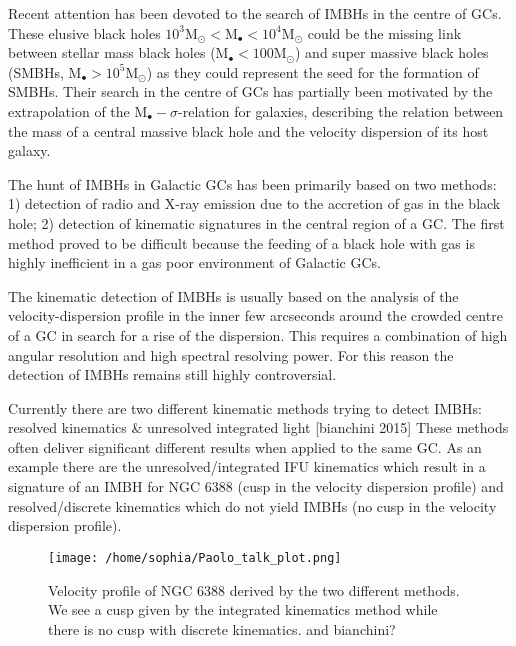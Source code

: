 \par Recent attention has been devoted to the search of \acp{IMBH} in the centre of \acp{GC}. These elusive black holes \(10^3 \mathrm{M}_\odot < \mathrm{M}_\bullet < 10^4 \mathrm{M}_\odot\) could be the missing link between stellar mass black holes (\(\mathrm{M}_\bullet < 100 \mathrm{M}_\odot\)) and super massive black holes (\acsp{SMBH}, \(\mathrm{M}_\bullet > 10^5 \mathrm{M}_\odot\)) as they could represent the seed for the formation of \acp{SMBH}. Their search in the centre of \acp{GC} has partially been motivated by the extrapolation of the \(\mathrm{M}_\bullet-\sigma\)-relation for galaxies, describing the relation between the mass of a central massive black hole and the velocity dispersion of its host galaxy.
\par The hunt of \acp{IMBH} in Galactic \acp{GC} has been primarily based on two methods: 1) detection of radio and X-ray emission due to the accretion of gas in the black hole; 2) detection of kinematic signatures in the central region of a \ac{GC}. The first method proved to be difficult because the feeding of a black hole with gas is highly inefficient in a gas poor environment of Galactic \acp{GC}. 
\par The kinematic detection of \acp{IMBH} is usually based on the analysis of the velocity-dispersion profile in the inner few arcseconds around the crowded centre of a \ac{GC} in search for a rise of the dispersion. This requires a combination of high angular resolution and high spectral resolving power. For this reason the detection of \acp{IMBH} remains still highly controversial. 
\par Currently there are two different kinematic methods trying to detect \acp{IMBH}: \color{red} resolved kinematics \& unresolved integrated light [bianchini 2015] \cite{2015MNRAS.453..365B} \color{black} These methods often deliver significant different results when applied to the same \ac{GC}. As an example there are the unresolved/integrated IFU kinematics which result in a signature of an \ac{IMBH} for NGC 6388 (cusp in the velocity dispersion profile) and resolved/discrete kinematics which do not yield \acp{IMBH} (no cusp in the velocity dispersion profile). 
\begin{figure}
\centering
\texttt{[image: /home/sophia/Paolo\_talk\_plot.png]}
\caption{Velocity profile of NGC 6388 derived by the two different methods. We see a cusp given by the integrated kinematics method while there is no cusp with discrete kinematics. \citep{2013ApJ...769..107L} \color{red}and bianchini?\color{black}}
\label{fig:NGC6388}
\end{figure}\
